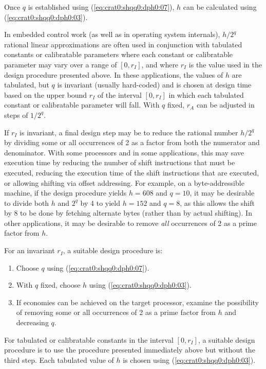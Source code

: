 \noindent{}Once $q$ is established using (\ref{eq:crat0:shqq0:dph0:07}),
$h$ can be calculated using (\ref{eq:crat0:shqq0:dph0:03}).

In embedded control work (as well as in operating system internals),
$h/2^q$ rational linear approximations are often used in conjunction with
tabulated constants or calibratable parameters
where each constant or calibratable parameter may vary over a range of
$[0, r_I]$, and where $r_I$ is the value used in the design procedure
presented above.  In these applications, the values of $h$ are
tabulated, but $q$ is invariant (usually hard-coded)
and is chosen at design time based on the upper bound $r_I$ 
of the interval $[0, r_I]$ in which each tabulated constant or calibratable
parameter will fall.  With $q$ fixed,
$r_A$ can be adjusted in steps of $1/2^q$.

If $r_I$ is invariant, a final design step may be to reduce the rational
number $h/2^q$ by dividing some or all occurrences of 2 as a factor from both the
numerator and denominator.  With some processors and in some applications, this
may save execution time by reducing the number of shift instructions that 
must be executed, reducing the execution time of the shift instructions
that are executed, or allowing shifting via offset addressing.
For example, on a byte-addressible machine, if the design procedure 
yields $h=608$ and $q=10$, it may be desirable to divide both $h$ and $2^q$ by 4 to
yield $h=152$ and $q=8$, as this allows the shift by 8 to be done by fetching 
alternate bytes (rather than by actual shifting).  In other applications, it may
be desirable to remove \emph{all} occurrences of 2 as a prime factor
from $h$.

For an invariant $r_I$, a suitable design procedure is:

\begin{enumerate}
\item Choose $q$ using (\ref{eq:crat0:shqq0:dph0:07}).
\item With $q$ fixed, choose $h$ using (\ref{eq:crat0:shqq0:dph0:03}).
\item If economies can be achieved on the target processor, 
      examine the possibility of removing some or all occurrences
	  of 2 as a prime factor from $h$ and decreasing $q$.
\end{enumerate}

For tabulated or calibratable constants in the
interval $[0,r_I]$, a suitable design procedure is to use the 
procedure presented immediately above but without the third step.
Each tabulated value of $h$ is chosen using (\ref{eq:crat0:shqq0:dph0:03}).

